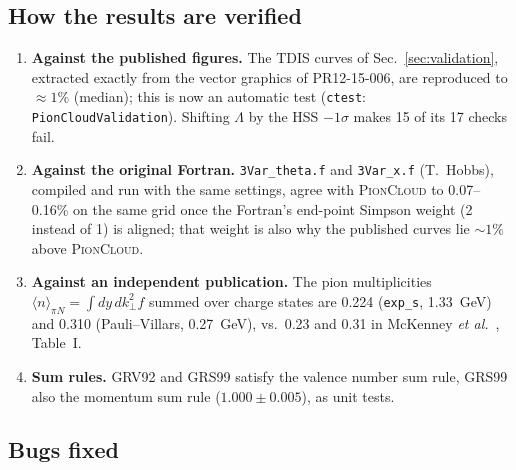 \documentclass[11pt,a4paper]{article}
\newcommand{\picloud}{\textsc{PionCloud}}
\begin{document}
\subsection{How the results are verified}

\begin{enumerate}
\item \textbf{Against the published figures.}  The TDIS curves of
  Sec.~\ref{sec:validation}, extracted exactly from the vector graphics of
  PR12-15-006, are reproduced to $\approx1\%$ (median); this is now an
  automatic test (\texttt{ctest}: \texttt{PionCloudValidation}).  Shifting
  $\Lambda$ by the HSS $-1\sigma$ makes 15 of its 17 checks fail.
\item \textbf{Against the original Fortran.}  \texttt{3Var\_theta.f} and
  \texttt{3Var\_x.f} (T.~Hobbs), compiled and run with the same settings,
  agree with \picloud{} to 0.07--0.16\% on the same grid once the
  Fortran's end-point Simpson weight (2 instead of 1) is aligned; that
  weight is also why the published curves lie $\sim1\%$ above \picloud{}.
\item \textbf{Against an independent publication.}  The pion
  multiplicities $\langle n\rangle_{\pi N}=\int dy\,dk_\perp^2 f$ summed over
  charge states are 0.224 (\texttt{exp\_s}, 1.33~GeV) and 0.310
  (Pauli--Villars, 0.27~GeV), vs.\ 0.23 and 0.31 in McKenney
  \textit{et al.}~\cite{McK16}, Table~I.
\item \textbf{Sum rules.}  GRV92 and GRS99 satisfy the valence number sum
  rule, GRS99 also the momentum sum rule ($1.000\pm0.005$), as unit tests.
\end{enumerate}

\subsection{Bugs fixed}
\end{document}
